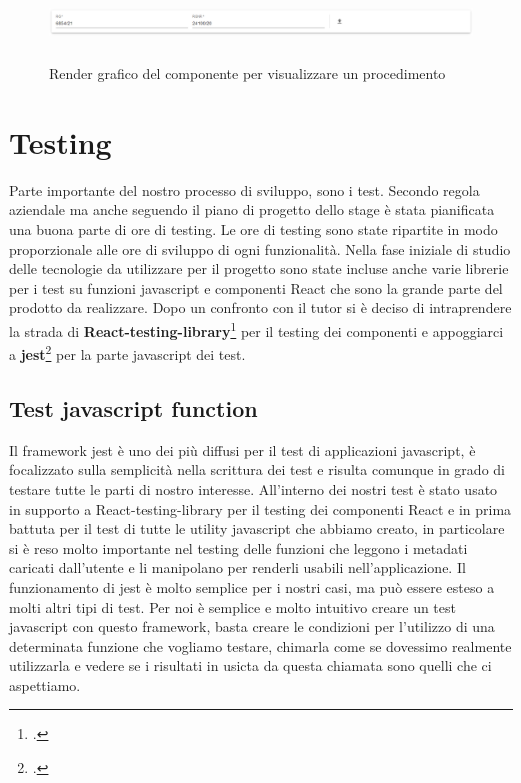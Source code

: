 \begin{figure}[H]
  \centering
  \includegraphics[width=\textwidth, height=2cm]{immagini/proceedingCard-render.png}
  \caption{Render grafico del componente per visualizzare un procedimento}
\end{figure}

\newpage
\section{Testing}
Parte importante del nostro processo di sviluppo, sono i test. Secondo regola aziendale ma anche seguendo il piano di progetto dello stage è stata pianificata una buona parte di ore di testing. Le ore di
testing sono state ripartite in modo proporzionale alle ore di sviluppo di ogni funzionalità. Nella fase iniziale di studio delle tecnologie da utilizzare per il progetto sono state incluse anche varie librerie per
i test su funzioni javascript e componenti React che sono la grande parte del prodotto da realizzare. Dopo un confronto con il tutor si è deciso di intraprendere la strada di \textbf{React-testing-library}\footcite{site:rtl} per il testing dei componenti
e appoggiarci a \textbf{jest}\footcite{site:jest} per la parte javascript dei test.

\subsection{Test javascript function}
Il framework jest è uno dei più diffusi per il test di applicazioni javascript, è focalizzato sulla semplicità nella scrittura dei test e risulta comunque in grado di testare tutte le parti di nostro interesse.
All'interno dei nostri test è stato usato in supporto a React-testing-library per il testing dei componenti React e in prima battuta per il test di tutte le utility javascript che abbiamo creato, in particolare si è reso molto importante
nel testing delle funzioni che leggono i metadati caricati dall'utente e li manipolano per renderli usabili nell'applicazione. Il funzionamento di jest è molto semplice per i nostri casi, ma può essere esteso a molti altri
tipi di test. Per noi è semplice e molto intuitivo creare un test javascript con questo framework, basta creare le condizioni per l'utilizzo di una determinata funzione che vogliamo testare, chimarla come se
dovessimo realmente utilizzarla e vedere se i risultati in usicta da questa chiamata sono quelli che ci aspettiamo.

